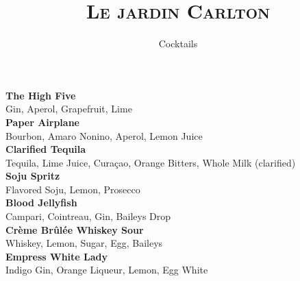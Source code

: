 \documentclass[12pt]{article}
\author{Cocktails}
\begin{document}
\BgThispage

\title{\textsc{Le jardin Carlton}}
\date{}
\maketitle

\vspace{0.8cm}

\textsf{\textbf{The High Five}} \\
{\monofont Gin, Aperol, Grapefruit, Lime} \\[1em]

\textsf{\textbf{Paper Airplane}} \\
{\monofont Bourbon, Amaro Nonino, Aperol, Lemon Juice} \\[1em]

\textsf{\textbf{Clarified Tequila}} \\
{\monofont Tequila, Lime Juice, Curaçao, Orange Bitters, Whole Milk (clarified)} \\[1em]

\textsf{\textbf{Soju Spritz}} \\
{\monofont Flavored Soju, Lemon, Prosecco} \\[1em]

\textsf{\textbf{Blood Jellyfish}} \\
{\monofont Campari, Cointreau, Gin, Baileys Drop} \\[1em]

\textsf{\textbf{Crème Brûlée Whiskey Sour}} \\
{\monofont Whiskey, Lemon, Sugar, Egg, Baileys} \\[1em]

\textsf{\textbf{Empress White Lady}} \\
{\monofont Indigo Gin, Orange Liqueur, Lemon, Egg White}
\end{document}
